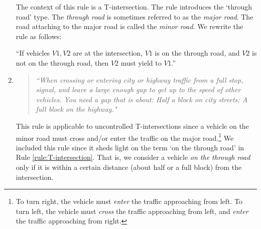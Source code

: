 \begin{enumerate}
The context of this rule is a T-intersection.
The rule introduces the `through road' type.
The \emph{through road} is sometimes referred to as the \emph{major road}.
The road attaching to the major road is called the \emph{minor road}.
We rewrite the rule as follows:
\begin{center}
``If vehicles $V1, V2$ are at the intersection,
$V1$ is on the through road, and
$V2$ is not on the through road,
then $V2$ must yield to $V1$.''
\end{center}

\item \label{rule:spaceToCross}
\begin{quote}
{\em ``When crossing or entering city or highway traffic from a full stop,
signal,
and leave a large enough gap to get up to the speed of other vehicles.
You need a gap that is about:
Half a block on city streets;
A full block on the highway."
\cite[p. 67]{DMV-California.2019}}
\end{quote}

This rule is applicable to uncontrolled T-intersections
since a vehicle on the minor road must
cross and/or enter the traffic on the major road.\footnote{To turn right,
the vehicle must \emph{enter} the traffic approaching from left.
To turn left,
the vehicle must \emph{cross} the traffic approaching from left,
and \emph{enter} the traffic approaching from right.}
We included this rule since
it sheds light on the term `on the through road'
in Rule \ref{rule:T-intersection}.
That is,
we consider a vehicle \emph{on the through road} only if
it is within a certain distance
(about half or a full block)
from the intersection.



\end{enumerate}
